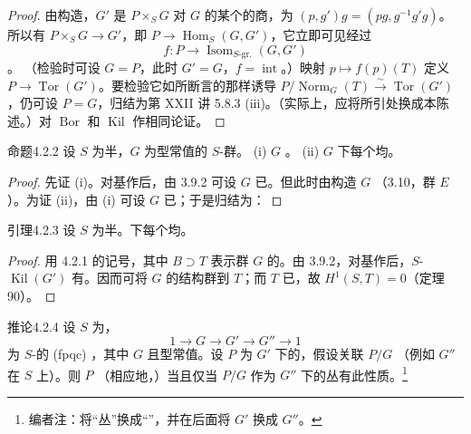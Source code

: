\begin{proof}
由构造，$G'$ 是 $P\times_SG$ 对 $G$ 的某个的商，为 $(p,g')g=(pg,g^{-1}g'g)$。所以有 $P\times_SG\to G'$，即 $P\to\operatorname{Hom}_S(G,G')$，它立即可见经过
\[f:P\longrightarrow\operatorname{Isom}_{S\text{-gr.}}(G,G')\]
。
（检验时可设 $G=P$，此时 $G'=G$，$f=\operatorname{int}$。）映射 $p\mapsto f(p)(T)$ 定义 $P\to\operatorname{Tor}(G')$。要检验它如所断言的那样诱导 $P/\operatorname{Norm}_G(T)\xrightarrow\sim\operatorname{Tor}(G')$，仍可设 $P=G$，归结为第 XXII 讲 5.8.3 (iii)。（实际上，应将所引处换成本陈述。）对 $\operatorname{Bor}$ 和 $\operatorname{Kil}$ 作相同论证。
\end{proof}
\begin{SGAresult}{命题}{4.2.2}
设 $S$ 为半，$G$ 为型常值的 $S$-群。
(i) $G$ 。
(ii) $G$ 下每个均。
\end{SGAresult}
\begin{proof}
先证 (i)。对基作后，由 3.9.2 可设 $G$ 已。但此时由构造 $G$ （3.10，群 $E$ ）。为证 (ii)，由 (i) 可设 $G$ 已；于是归结为：
\end{proof}
\begin{SGAresult}{引理}{4.2.3}
设 $S$ 为半。下每个均。
\end{SGAresult}
\begin{proof}
用 4.2.1 的记号，其中 $B\supset T$ 表示群 $G$ 的。由 3.9.2，对基作后，$S$- $\operatorname{Kil}(G')$ 有。因而可将 $G$ 的结构群到 $T$；而 $T$ 已，故 $H^1(S,T)=0$（定理 90）。
\end{proof}
\begin{SGAresult}{推论}{4.2.4}
设 $S$ 为，
\[1\longrightarrow G\longrightarrow G'\longrightarrow G''\longrightarrow1\]
为 $S$-的 (fpqc) ，其中 $G$ 且型常值。设 $P$ 为 $G'$ 下的，假设关联 $P/G$ （例如 $G''$ 在 $S$ 上）。则 $P$ （相应地，）当且仅当 $P/G$ 作为 $G''$ 下的丛有此性质。\footnote[19]{编者注：将“丛”换成“”，并在后面将 $G'$ 换成 $G''$。}
\end{SGAresult}
